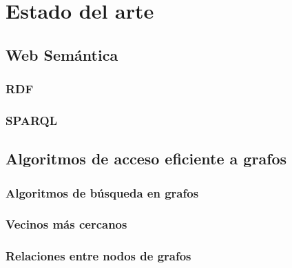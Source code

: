 \chapter{Estado del arte}
\section{Web Semántica}
\subsection{RDF}
\subsection{SPARQL}
\section{Algoritmos de acceso eficiente a grafos}
\subsection{Algoritmos de búsqueda en grafos}
\subsection{Vecinos más cercanos}
\subsection{Relaciones entre nodos de grafos}